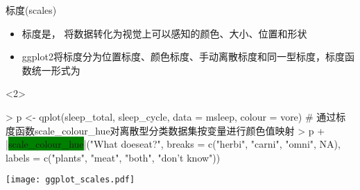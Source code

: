 \begin{frame}[t,fragile]{\subsecname}{标度(scales)}
\begin{itemize}
\item 标度是，
将数据转化为视觉上可以感知的颜色、大小、位置和形状
\item ggplot2将标度分为位置标度、颜色标度、手动离散标度和同一型标度，标度函数统一形式为
\end{itemize}

\begin{overlayarea}{\textwidth}{\textheight}

\begin{onlyenv}<2>
\begin{minipage}{\textwidth}
\begin{rcode}
> p <- qplot(sleep_total, sleep_cycle, data = msleep, colour = vore)
# 通过标度函数scale\_colour\_hue对离散型分类数据集按变量进行颜色值映射
> p + |\colorbox{green}{scale\_colour\_hue}|("What does\nit eat?", breaks = c("herbi", "carni", "omni", NA), labels = c("plants", "meat", "both", "don’t know"))
\end{rcode}
\end{minipage}

\begin{minipage}{\textwidth}
\centering
\texttt{[image: ggplot\_scales.pdf]}
\end{minipage}
\end{onlyenv}
\end{overlayarea}
\end{frame}

